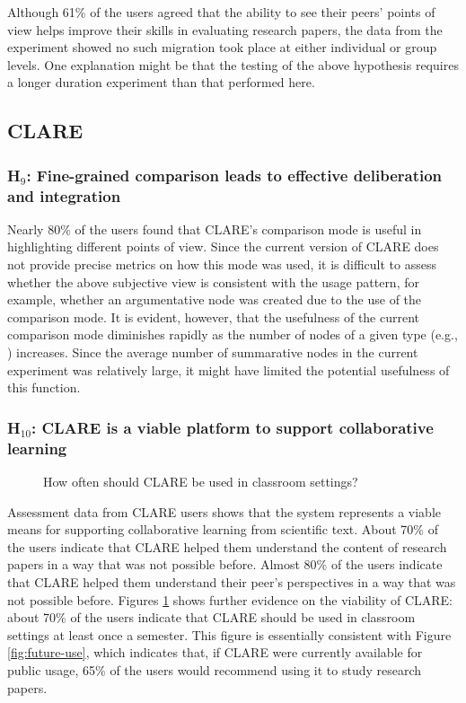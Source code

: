 Although 61\% of the users agreed that the ability to see their peers'
points of view helps improve their skills in evaluating research papers,
the data from the experiment showed no such migration took place at either
individual or group levels. One explanation might be that the testing of
the above hypothesis requires a longer duration experiment than that
performed here.


\subsection{CLARE}
\label{sec:c6-clare-hypothesis}

\subsubsection{H\(_9\): Fine-grained comparison leads to effective
deliberation and integration}

Nearly 80\% of the users found that CLARE's comparison mode is useful in
highlighting different points of view. Since the current version of CLARE
does not provide precise metrics on how this mode was used, it is difficult
to assess whether the above subjective view is consistent with the usage
pattern, for example, whether an argumentative node was created due to the
use of the comparison mode. It is evident, however, that the usefulness of
the current comparison mode diminishes rapidly as the number of nodes of a
given type (e.g., ) increases. Since the average number of
summarative nodes in the current experiment was relatively large, it might
have limited the potential usefulness of this function.


\subsubsection{H\(_{10}\): CLARE is a viable platform to support
collaborative learning}

\begin{figure}[hbtp]
  \caption{How often should CLARE be used in classroom settings?}
  \label{fig:freq-use}
\end{figure}

Assessment data from CLARE users shows that the system represents a viable
means for supporting collaborative learning from scientific text. About
70\% of the users indicate that CLARE helped them understand the content of
research papers in a way that was not possible before. Almost 80\% of the
users indicate that CLARE helped them understand their peer's perspectives
in a way that was not possible before. Figures \ref{fig:freq-use} shows
further evidence on the viability of CLARE: about 70\% of the users
indicate that CLARE should be used in classroom settings at least once a
semester.  This figure is essentially consistent with Figure
\ref{fig:future-use}, which indicates that, if CLARE were currently
available for public usage, 65\% of the users would recommend using it to
study research papers.

